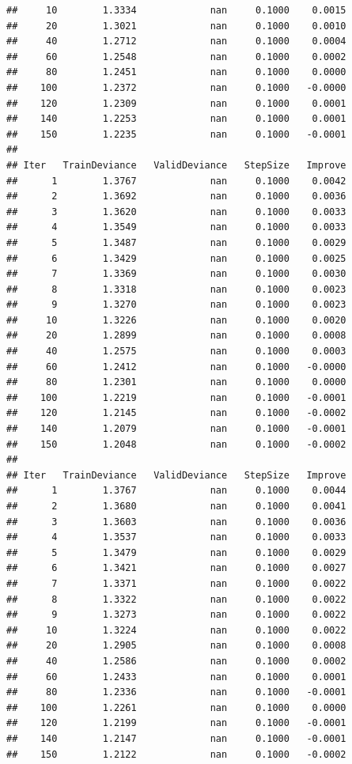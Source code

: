 \documentclass[]{article}
\begin{document}
\begin{verbatim}
##     10        1.3334             nan     0.1000    0.0015
##     20        1.3021             nan     0.1000    0.0010
##     40        1.2712             nan     0.1000    0.0004
##     60        1.2548             nan     0.1000    0.0002
##     80        1.2451             nan     0.1000    0.0000
##    100        1.2372             nan     0.1000   -0.0000
##    120        1.2309             nan     0.1000    0.0001
##    140        1.2253             nan     0.1000    0.0001
##    150        1.2235             nan     0.1000   -0.0001
## 
## Iter   TrainDeviance   ValidDeviance   StepSize   Improve
##      1        1.3767             nan     0.1000    0.0042
##      2        1.3692             nan     0.1000    0.0036
##      3        1.3620             nan     0.1000    0.0033
##      4        1.3549             nan     0.1000    0.0033
##      5        1.3487             nan     0.1000    0.0029
##      6        1.3429             nan     0.1000    0.0025
##      7        1.3369             nan     0.1000    0.0030
##      8        1.3318             nan     0.1000    0.0023
##      9        1.3270             nan     0.1000    0.0023
##     10        1.3226             nan     0.1000    0.0020
##     20        1.2899             nan     0.1000    0.0008
##     40        1.2575             nan     0.1000    0.0003
##     60        1.2412             nan     0.1000   -0.0000
##     80        1.2301             nan     0.1000    0.0000
##    100        1.2219             nan     0.1000   -0.0001
##    120        1.2145             nan     0.1000   -0.0002
##    140        1.2079             nan     0.1000   -0.0001
##    150        1.2048             nan     0.1000   -0.0002
## 
## Iter   TrainDeviance   ValidDeviance   StepSize   Improve
##      1        1.3767             nan     0.1000    0.0044
##      2        1.3680             nan     0.1000    0.0041
##      3        1.3603             nan     0.1000    0.0036
##      4        1.3537             nan     0.1000    0.0033
##      5        1.3479             nan     0.1000    0.0029
##      6        1.3421             nan     0.1000    0.0027
##      7        1.3371             nan     0.1000    0.0022
##      8        1.3322             nan     0.1000    0.0022
##      9        1.3273             nan     0.1000    0.0022
##     10        1.3224             nan     0.1000    0.0022
##     20        1.2905             nan     0.1000    0.0008
##     40        1.2586             nan     0.1000    0.0002
##     60        1.2433             nan     0.1000    0.0001
##     80        1.2336             nan     0.1000   -0.0001
##    100        1.2261             nan     0.1000    0.0000
##    120        1.2199             nan     0.1000   -0.0001
##    140        1.2147             nan     0.1000   -0.0001
##    150        1.2122             nan     0.1000   -0.0002
\end{verbatim}
\end{document}

